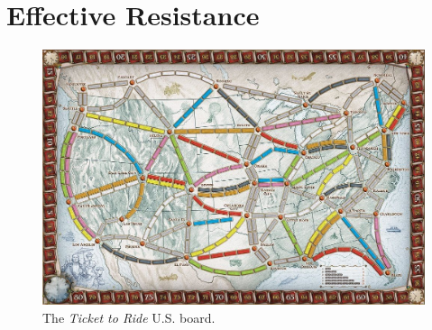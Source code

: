 \section{Effective Resistance}

\begin{figure}[ht]
\centering
\includegraphics[scale=.2]{figures/board}
\caption{The \textit{Ticket to Ride} U.S. board.}
\label{fig:board}
\end{figure}